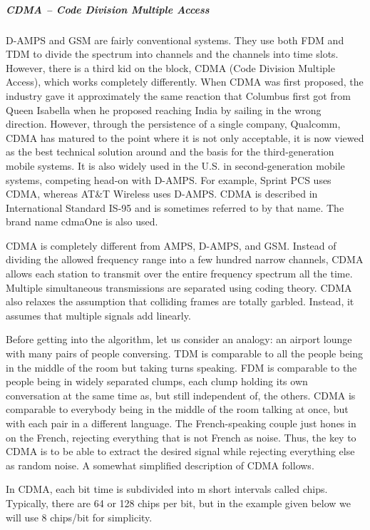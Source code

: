 \documentclass[b5paper,11pt]{memoir}
\begin{document}
\protect\hypertarget{0130661023_ch02lev1sec6.htmlux5cux23ch02lev3sec24}{}{}

\subparagraph{CDMA -- Code Division Multiple Access}

D-AMPS and GSM are fairly conventional systems. They use both FDM and
TDM to divide the spectrum into channels and the channels into time
slots. However, there is a third kid on the block, {CDMA} ({Code
Division Multiple Access}), which works completely differently. When
CDMA was first proposed, the industry gave it approximately the same
reaction that Columbus first got from Queen Isabella when he proposed
reaching India by sailing in the wrong direction. However, through the
persistence of a single company, Qualcomm, CDMA has matured to the point
where it is not only acceptable, it is now viewed as the best technical
solution around and the basis for the third-generation mobile systems.
It is also widely used in the U.S. in second-generation mobile systems,
competing head-on with D-AMPS. For example, Sprint PCS uses CDMA,
whereas AT\&T Wireless uses D-AMPS. CDMA is described in International
Standard IS-95 and is sometimes referred to by that name. The brand name
{cdmaOne} is also used.

CDMA is completely different from AMPS, D-AMPS, and GSM. Instead of
dividing the allowed frequency range into a few hundred narrow channels,
CDMA allows each station to transmit over the entire frequency spectrum
all the time. Multiple simultaneous transmissions are separated using
coding theory. CDMA also relaxes the assumption that colliding frames
are totally garbled. Instead, it assumes that multiple signals add
linearly.

Before getting into the algorithm, let us consider an analogy: an
airport lounge with many pairs of people conversing. TDM is comparable
to all the people being in the middle of the room but taking turns
speaking. FDM is comparable to the people being in widely separated
clumps, each clump holding its own conversation at the same time as, but
still independent of, the others. CDMA is comparable to everybody being
in the middle of the room talking at once, but with each pair in a
different language. The French-speaking couple just hones in on the
French, rejecting everything that is not French as noise. Thus, the key
to CDMA is to be able to extract the desired signal while rejecting
everything else as random noise. A somewhat simplified description of
CDMA follows.

In CDMA, each bit time is subdivided into {m} short intervals called
{chips}. Typically, there are 64 or 128 chips per bit, but in the
example given below we will use 8 chips/bit for simplicity.
\end{document}
